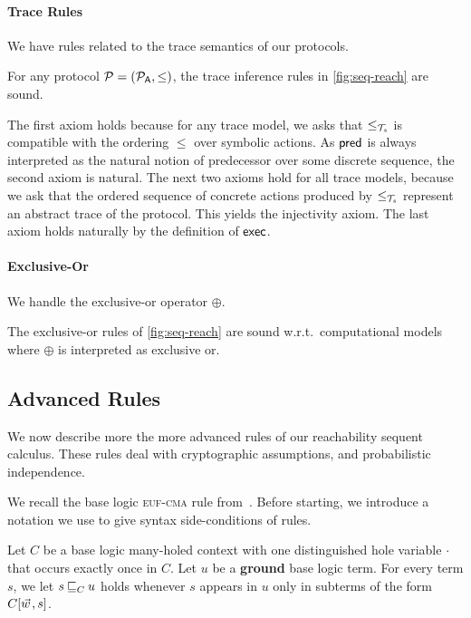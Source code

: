 \paragraph{Trace Rules}
We have rules related to the trace semantics of our protocols.

\begin{proposition}
  For any protocol $\mathcal{P} = (\mathcal{P}_{\textsf{A}}, \le)$, the trace inference rules in \cref{fig:seq-reach} are sound.
\end{proposition}


The first axiom holds because for any trace model, we asks that $\leq_{\mathcal{T}_s}$ is compatible with the ordering $\leq$ over symbolic actions.
As $\textsf{pred}$ is always interpreted as the natural notion of predecessor over some discrete sequence, the second axiom is natural. The next two axioms hold for all trace models, because we ask that the ordered sequence of concrete actions produced by $\leq_{\mathcal{T}_s}$ represent an abstract trace of the protocol. This yields the injectivity axiom. The last axiom holds naturally by the definition of $\textsf{exec}$.

\paragraph{Exclusive-Or}
We handle the exclusive-or operator $\oplus$.

\begin{proposition}
  The exclusive-or rules of \cref{fig:seq-reach} are sound w.r.t.\ computational models
  where $\oplus$ is interpreted as exclusive or.
\end{proposition}

\subsection{Advanced Rules}
We now describe more the more advanced rules of our reachability sequent calculus. These rules deal with cryptographic assumptions, and probabilistic independence.

We recall the base logic \textsc{euf-cma} rule from~\cite{DBLP:conf/eurosp/Koutsos19}. Before starting, we introduce a notation we use to give syntax side-conditions of rules.
\begin{definition}
  \label{def:occ-sc}
  Let $C$ be a base logic many-holed context with one distinguished hole variable $\cdot$ that occurs exactly once in $C$. Let $u$ be a \textbf{ground} base logic term. For every term $s$, we let $s \mathbin{\sqsubseteq}_{C} u$ holds whenever $s$ appears in $u$ only in subterms of the form $C[\pvec{w},s]$.
\end{definition}

